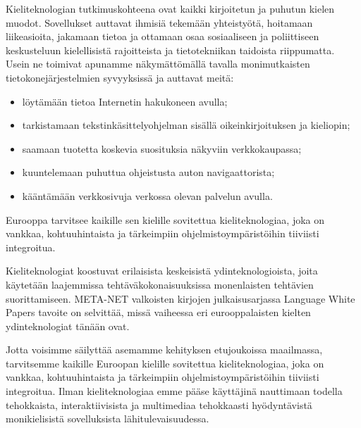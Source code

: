 \documentclass[]{../../metanetpaper}
\begin{document}
\begin{Parallel}[c]{77mm}{77mm}
{Kieliteknologian tutkimuskohteena ovat kaikki kirjoitetun ja puhutun kielen
muodot. Sovellukset auttavat ihmisiä tekemään yhteistyötä, hoitamaan
liikeasioita, jakamaan tietoa ja ottamaan osaa sosiaaliseen ja poliittiseen
keskusteluun kielellisistä rajoitteista ja tietotekniikan taidoista
riippumatta. Usein ne toimivat apunamme näkymättömällä tavalla monimutkaisten
tietokonejärjestelmien syvyyksissä ja auttavat meitä:
\begin{itemize}
\item löytämään tietoa Internetin hakukoneen avulla;

\item tarkistamaan tekstinkäsittelyohjelman sisällä oikeinkirjoituksen ja kieliopin;

\item saamaan tuotetta koskevia suosituksia näkyviin verkkokaupassa;

\item kuuntelemaan puhuttua ohjeistusta auton navigaattorista;

\item kääntämään verkkosivuja verkossa olevan palvelun avulla.
\end{itemize}
Eurooppa tarvitsee kaikille sen kielille sovitettua kieliteknologiaa, joka on
vankkaa, kohtuuhintaista ja tärkeimpiin ohjelmistoympäristöihin tiiviisti
integroitua.





Kieliteknologiat koostuvat erilaisista keskeisistä ydinteknologioista, joita
käytetään laajemmissa tehtäväkokonaisuuksissa monenlaisten tehtävien
suorittamiseen. META-NET valkoisten kirjojen julkaisusarjassa Language White
Papers tavoite on selvittää, missä vaiheessa eri eurooppalaisten kielten
ydinteknologiat tänään ovat.

Jotta voisimme säilyttää asemamme kehityksen etujoukoissa maailmassa,
tarvitsemme kaikille Euroopan kielille sovitettua kieliteknologiaa, joka on
vankkaa, kohtuuhintaista ja tärkeimpiin ohjelmistoympäristöihin tiiviisti
integroitua. Ilman kieliteknologiaa emme pääse käyttäjinä nauttimaan todella
tehokkaista, interaktiivisista ja multimediaa tehokkaasti hyödyntävistä
monikielisistä sovelluksista lähitulevaisuudessa.
}

\end{Parallel}
\end{document}
